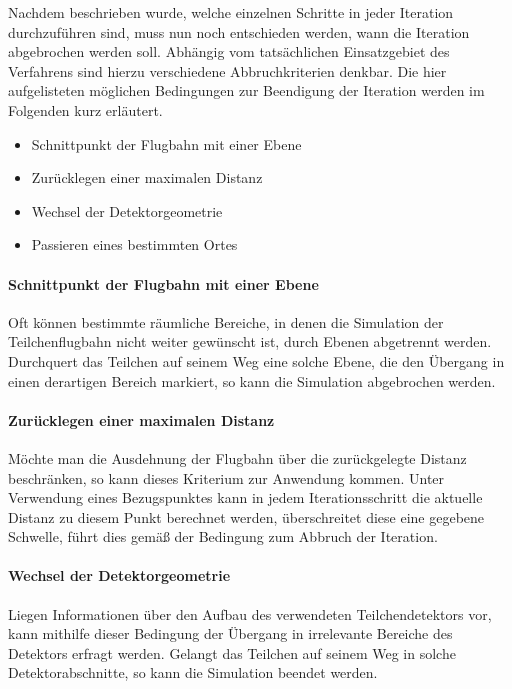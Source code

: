 Nachdem beschrieben wurde, welche einzelnen Schritte in jeder Iteration durchzuf\"uhren sind, muss nun noch entschieden werden,
wann die Iteration abgebrochen werden soll. Abh\"angig vom tats\"achlichen Einsatzgebiet des Verfahrens sind hierzu verschiedene
Abbruchkriterien denkbar.
Die hier aufgelisteten m\"oglichen Bedingungen zur Beendigung der Iteration werden im Folgenden kurz erl\"autert.
\begin{itemize}
\item Schnittpunkt der Flugbahn mit einer Ebene
\item Zur\"ucklegen einer maximalen Distanz
\item Wechsel der Detektorgeometrie
\item Passieren eines bestimmten Ortes
\end{itemize}

\paragraph{Schnittpunkt der Flugbahn mit einer Ebene}
Oft k\"onnen bestimmte r\"aumliche Bereiche, in denen die Simulation der Teilchenflugbahn nicht weiter gew\"unscht ist, durch
Ebenen abgetrennt werden. Durchquert das Teilchen auf seinem Weg eine solche Ebene, die den \"Ubergang in einen derartigen Bereich
markiert, so kann die Simulation abgebrochen werden.

\paragraph{Zur\"ucklegen einer maximalen Distanz}
M\"ochte man die Ausdehnung der Flugbahn \"uber die zur\"uckgelegte Distanz beschr\"anken, so kann dieses Kriterium zur Anwendung
kommen. Unter Verwendung eines Bezugspunktes kann in jedem Iterationsschritt die aktuelle Distanz zu diesem Punkt berechnet werden,
\"uberschreitet diese eine gegebene Schwelle, f\"uhrt dies gem\"a{\ss} der Bedingung zum Abbruch der Iteration.

\paragraph{Wechsel der Detektorgeometrie}
Liegen Informationen \"uber den Aufbau des verwendeten Teilchendetektors vor, kann mithilfe dieser Bedingung der \"Ubergang in
irrelevante Bereiche des Detektors erfragt werden. Gelangt das Teilchen auf seinem Weg in solche Detektorabschnitte, so kann die
Simulation beendet werden.

